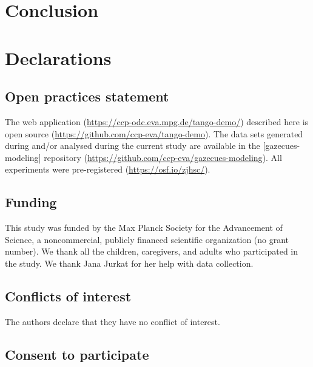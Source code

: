 \documentclass[
  man,floatsintext]{apa6}
\begin{document}
\hypertarget{conclusion}{%
\section{Conclusion}\label{conclusion}}

\newpage

\hypertarget{declarations}{%
\section{Declarations}\label{declarations}}

\hypertarget{open-practices-statement}{%
\subsection{Open practices statement}\label{open-practices-statement}}

The web application (\url{https://ccp-odc.eva.mpg.de/tango-demo/}) described here is open source (\url{https://github.com/ccp-eva/tango-demo}).
The data sets generated during and/or analysed during the current study are available in the {[}gazecues-modeling{]} repository (\url{https://github.com/ccp-eva/gazecues-modeling}).
All experiments were pre-registered (\url{https://osf.io/zjhsc/}).

\hypertarget{funding}{%
\subsection{Funding}\label{funding}}

This study was funded by the Max Planck Society for the Advancement of Science, a noncommercial, publicly financed scientific organization (no grant number).
We thank all the children, caregivers, and adults who participated in the study.
We thank Jana Jurkat for her help with data collection.

\hypertarget{conflicts-of-interest}{%
\subsection{Conflicts of interest}\label{conflicts-of-interest}}

The authors declare that they have no conflict of interest.

\hypertarget{consent-to-participate}{%
\subsection{Consent to participate}\label{consent-to-participate}}
\end{document}
